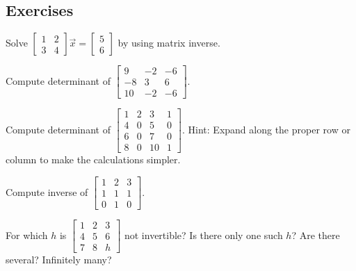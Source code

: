 \documentclass[12pt]{book}
\begin{document}
\subsection{Exercises}

\begin{exercise}
Solve
$\left[ \begin{smallmatrix}
1 & 2 \\
3 & 4 
\end{smallmatrix} \right] \vec{x} =
\left[ \begin{smallmatrix}
5 \\
6
\end{smallmatrix} \right]$ by using matrix inverse.
\end{exercise}

\begin{exercise}
Compute determinant of
$\left[ \begin{smallmatrix}
9 & -2 & -6 \\
-8 & 3 & 6 \\
10 & -2 & -6
\end{smallmatrix} \right]$.
\end{exercise}

\begin{exercise}
Compute determinant of
$\left[ \begin{smallmatrix}
1 & 2 & 3 & 1 \\
4 & 0 & 5 & 0 \\
6 & 0 & 7 & 0 \\
8 & 0 & 10 & 1
\end{smallmatrix} \right]$.  Hint: Expand along the proper row or column to
make the calculations simpler.
\end{exercise}

\begin{exercise}
Compute inverse of
$\left[ \begin{smallmatrix}
1 & 2 & 3 \\
1 & 1 & 1 \\
0 & 1 & 0
\end{smallmatrix} \right]$.
\end{exercise}

\begin{exercise}
For which $h$ is
$\left[ \begin{smallmatrix}
1 & 2 & 3 \\
4 & 5 & 6 \\
7 & 8 & h
\end{smallmatrix} \right]$
not invertible?  Is there only one such $h$?  Are there several?  Infinitely
many?
\end{exercise}
\end{document}
